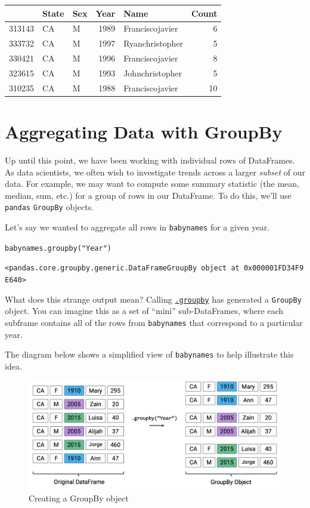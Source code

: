 \documentclass[
  letterpaper,
  DIV=11,
  numbers=noendperiod]{scrreprt}
\begin{document}
\begin{tabular}{lllrlr}
\toprule
{} & State & Sex &  Year &             Name &  Count \\
\midrule
313143 &    CA &   M &  1989 &  Franciscojavier &      6 \\
333732 &    CA &   M &  1997 &  Ryanchristopher &      5 \\
330421 &    CA &   M &  1996 &  Franciscojavier &      8 \\
323615 &    CA &   M &  1993 &  Johnchristopher &      5 \\
310235 &    CA &   M &  1988 &  Franciscojavier &     10 \\
\bottomrule
\end{tabular}

\hypertarget{aggregating-data-with-groupby}{%
\section{Aggregating Data with
GroupBy}\label{aggregating-data-with-groupby}}

Up until this point, we have been working with individual rows of
DataFrames. As data scientists, we often wish to investigate trends
across a larger \emph{subset} of our data. For example, we may want to
compute some summary statistic (the mean, median, sum, etc.) for a group
of rows in our DataFrame. To do this, we'll use \texttt{pandas}
\texttt{GroupBy} objects.

Let's say we wanted to aggregate all rows in \texttt{babynames} for a
given year.

\texttt{babynames.groupby("Year")}

\texttt{\textless{}pandas.core.groupby.generic.DataFrameGroupBy\ object\ at\ 0x000001FD34F9E640\textgreater{}}

What does this strange output mean? Calling
\href{https://pandas.pydata.org/pandas-docs/stable/reference/api/pandas.DataFrame.groupby.html}{\texttt{.groupby}}
has generated a \texttt{GroupBy} object. You can imagine this as a set
of ``mini'' sub-DataFrames, where each subframe contains all of the rows
from \texttt{babynames} that correspond to a particular year.

The diagram below shows a simplified view of \texttt{babynames} to help
illustrate this idea.

\begin{figure}

{\centering \includegraphics{pandas_2/images/gb.png}

}

\caption{Creating a GroupBy object}

\end{figure}
\end{document}
